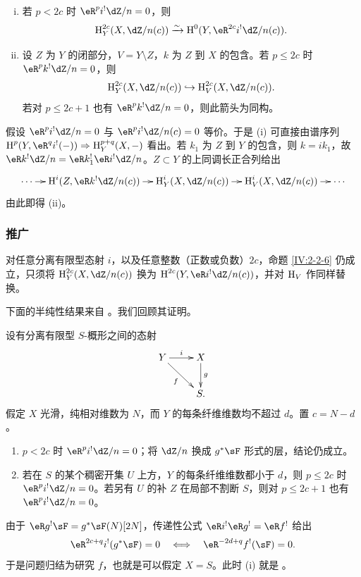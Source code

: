 \begin{proposition}\label{IV:2-2-6}
\begin{enumerate}[(i)]
\item 若 $p<2c$ 时 $\eR^pi^!\dZ/n=0$，则
\[
\h_Y^{2c}(X,\dZ/n(c))\iso\h^0(Y,\eR^{2c}i^!\dZ/n(c)).
\]
\item 设 $Z$ 为 $Y$ 的闭部分，$V=Y\setminus Z$，$k$ 为 $Z$ 到 $X$ 的包含。若 $p\leqslant2c$ 时 $\eR^pk^!\dZ/n=0$，则
\[
\h_Y^{2c}(X,\dZ/n(c))\hookrightarrow\h_V^{2c}(X,\dZ/n(c)).
\]
若对 $p\leqslant2c+1$ 也有 $\eR^pk^!\dZ/n=0$，则此箭头为同构。
\end{enumerate}
\end{proposition}
假设 $\eR^pi^!\dZ/n=0$ 与 $\eR^pi^!\dZ/n(c)=0$ 等价。于是 (i) 可直接由谱序列 $\h^p(Y,\eR^qi^!(-))\Rightarrow\h_Y^{p+q}(X,-)$ 看出。若 $k_1$ 为 $Z$ 到 $Y$ 的包含，则 $k=ik_1$，故 $\eR k^!\dZ/n=\eR k_1^!\eR i^!\dZ/n$。$Z\subset Y$ 的上同调长正合列给出
\[\xymatrix@C=10pt{
\cdots\ar[r]&\h^i(Z,\eR k^!\dZ/n(c))\ar[r]&\h_Y^i(X,\dZ/n(c))\ar[r]&\h_V^i(X,\dZ/n(c))\ar[r]&\cdots
}\]
由此即得 (ii)。

\subsubsection{推广}\label{IV:2-2-7}
对任意分离有限型态射 $i$，以及任意整数（正数或负数）$2c$，命题 \ref{IV:2-2-6} 仍成立，只须将 $\h_Y^{2c}(X,\dZ/n(c))$ 换为 $\h^{2c}(Y,\eR i^!\dZ/n(c))$，并对 $\operatorname{H}_V$ 作同样替换。

下面的半纯性结果来自 \cite[XIV 1.8, 1.10, 1.15]{sga2}。我们回顾其证明。

\begin{theorem}\label{IV:2-2-8}
设有分离有限型 $S$-概形之间的态射
\[\xymatrix{Y\ar[r]^-i\ar[dr]_-f&X\ar[d]^-g\\&S.}\]
假定 $X$ 光滑，纯相对维数为 $N$，而 $Y$ 的每条纤维维数均不超过 $d$。置 $c=N-d$。
\begin{enumerate}[\indent (i)]
\item $p<2c$ 时 $\eR^pi^!\dZ/n=0$；将 $\dZ/n$ 换成 $g^*\sF$ 形式的层，结论仍成立。
\item 若在 $S$ 的某个稠密开集 $U$ 上方，$Y$ 的每条纤维维数都小于 $d$，则 $p\leqslant2c$ 时 $\eR^pi^!\dZ/n=0$。若另有 $U$ 的补 $Z$ 在局部不割断 $S$，则对 $p\leqslant2c+1$ 也有 $\eR^pi^!\dZ/n=0$。
\end{enumerate}
\end{theorem}
由于 $\eR g^!\sF=g^*\sF(N)[2N]$，传递性公式 $\eR i^!\eR g^!=\eR f^!$ 给出
\[
\eR^{2c+q}i^!(g^*\sF)=0\quad\Longleftrightarrow\quad\eR^{-2d+q}f^!(\sF)=0.
\]
于是问题归结为研究 $f$，也就是可以假定 $X=S$。此时 (i) 就是 \cite[XVIII 3.17]{sga4}。

